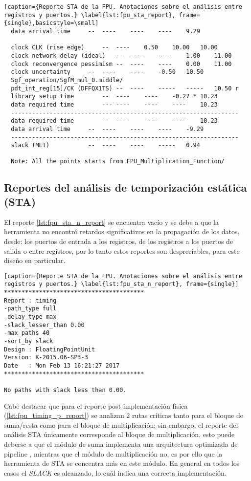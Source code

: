 \begin{lstlisting}[caption={Reporte STA de la FPU. Anotaciones sobre el análisis entre registros y puertos.} \label{lst:fpu_sta_report}, frame={single},basicstyle=\small]
  data arrival time		--	----	----	----	9.29

  clock CLK (rise edge)		--	----	0.50	10.00	10.00
  clock network delay (ideal)	--	----	----	1.00	11.00
  clock reconvergence pessimism	--	----	----	0.00	11.00
  clock uncertainty		--	----	----	-0.50	10.50
  Sgf_operation/SgfM_mul_0.middle/
  pdt_int_reg[15]/CK (DFFQX1TS)	--	----	-----	-----	10.50 r
  library setup time		--	----	----	-0.27 *	10.23
  data required time		---	----	----	----	10.23
  -----------------------------------------------------------------
  data required time		--	----	----	----	10.23
  data arrival time		--	----	----	----	-9.29
  -----------------------------------------------------------------
  slack (MET)			--	----	----	-----	0.94
  
  Note: All the points starts from FPU_Multiplication_Function/

\end{lstlisting}

\subsection{Reportes del análisis de temporización estática (STA)}

El reporte \ref{lst:fpu_sta_n_report} se encuentra vacío y se debe a que la herramienta no encontró retardos significativos en la propagación de los datos, desde: los puertos de entrada a los registros, de los registros a los puertos de salida o entre registros, por lo tanto estos reportes son despreciables, para este diseño en particular.

\begin{lstlisting}[caption={Reporte STA de la FPU. Anotaciones sobre el análisis entre registros y puertos.} \label{lst:fpu_sta_n_report}, frame={single}]
****************************************
Report : timing
-path_type full
-delay_type max
-slack_lesser_than 0.00
-max_paths 40
-sort_by slack
Design : FloatingPointUnit
Version: K-2015.06-SP3-3
Date   : Mon Feb 13 16:21:27 2017
****************************************

No paths with slack less than 0.00.
\end{lstlisting}

Cabe destacar que para el reporte post implementación física (\ref{lst:fpu_timing_p_report}) se analizan 2 rutas críticas tanto para el bloque de suma/resta como para el bloque de multiplicación; sin embargo, el reporte del análisis STA únicamente corresponde al bloque de multiplicación, esto puede deberse a que el módulo de suma implementa una arquitectura optimizada de pipeline \cite{Francis2016}, mientras que el módulo de multiplicación no, es por ello que la herramienta de STA se concentra más en este módulo. En general en todos los casos el \textit{SLACK} es alcanzado, lo cuál indica una correcta implementación.


